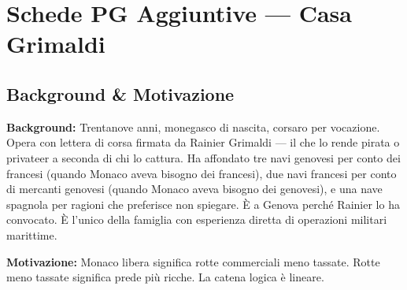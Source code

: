 
\chapter{Schede PG Aggiuntive --- Casa Grimaldi}



\section*{Background \& Motivazione}

\begin{rulebox}{}
  \textbf{Background:} Trentanove anni, monegasco di nascita, corsaro per vocazione.
  Opera con lettera di corsa firmata da Rainier Grimaldi — il che lo rende
  pirata o privateer a seconda di chi lo cattura. Ha affondato tre navi
  genovesi per conto dei francesi (quando Monaco aveva bisogno dei francesi),
  due navi francesi per conto di mercanti genovesi (quando Monaco aveva bisogno
  dei genovesi), e una nave spagnola per ragioni che preferisce non spiegare.
  È a Genova perché Rainier lo ha convocato. È l'unico della famiglia con
  esperienza diretta di operazioni militari marittime.

  \medskip\noindent\textcolor{GrimaldiPurple}{\textbf{Motivazione:}} Monaco libera
  significa rotte commerciali meno tassate. Rotte meno tassate significa
  prede più ricche. La catena logica è lineare.
\end{rulebox}

